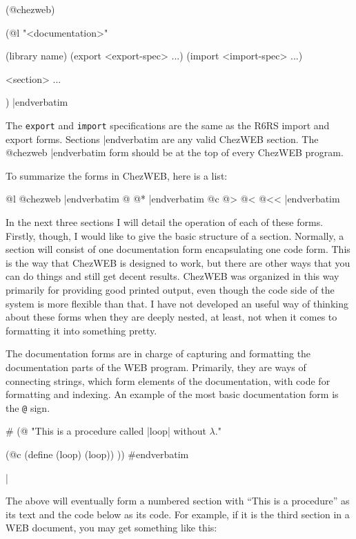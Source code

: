 \medskip\verbatim
(@chezweb)

(@l "<documentation>"

(library name)
(export <export-spec> ...)
(import <import-spec> ...)

<section> ...

)
|endverbatim
\medskip

\noindent
The {\tt export} and {\tt import}
specifications are the same as the R6RS import and
export forms.  
\verbatim Sections |endverbatim 
are any valid ChezWEB
section.  The 
\verbatim @chezweb |endverbatim 
form should be at the top
of every ChezWEB program.

To summarize the forms in ChezWEB, here is a list:

\medskip
{}
\verbatim @l @chezweb |endverbatim
\verbatim @ @* |endverbatim
\verbatim @c @> @< @<< |endverbatim
\medskip

\noindent
In the next three sections I will detail the operation of each of
these forms.  Firstly, though, I would like to give the basic
structure of a section.  Normally, a section will consist of one
documentation form encapsulating one code form.  This is the way that
ChezWEB is designed to work, but there are other ways that you can do
things and still get decent results.  ChezWEB was organized in this
way primarily for providing good printed output, even though the code
side of the system is more flexible than that.  I have not developed
an useful way of thinking about these forms when they are deeply
nested, at least, not when it comes to formatting it into something
pretty.

%
The documentation forms are in charge of capturing and formatting the
documentation parts of the WEB program.  Primarily, they are ways of
connecting strings, which form elements of the documentation, with
code for formatting and indexing.  An example of the most basic
documentation form is the {\tt @} sign.

\verbatimescapechar \#
\medskip\verbatim
(@
"This is a procedure called |loop|
without $\lambda$."

(@c
(define (loop) (loop))
))
#endverbatim
\medskip

\verbatimescapechar |

\noindent
The above will eventually form a numbered section with ``This is a
procedure'' as its text and the code below as its code.  For example,
if it is the third section in a WEB document, you may get something
like this:

